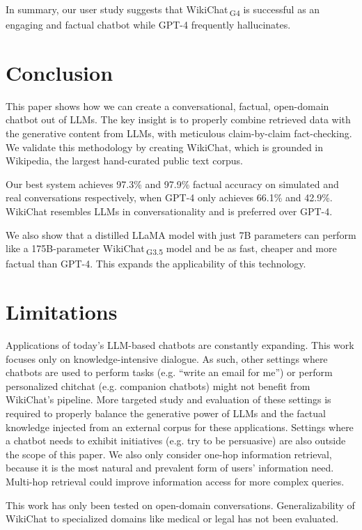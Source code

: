 \documentclass[11pt]{article}
\newcommand{\system}[0]{WikiChat\xspace}
\newcommand{\systemgt}[0]{WikiChat$\,$\textsubscript{G3.5}\xspace}
\newcommand{\systemgf}[0]{WikiChat$\,$\textsubscript{G4}\xspace}
\begin{document}
In summary, our user study suggests that \systemgf is successful as an engaging and factual chatbot while GPT-4 frequently hallucinates.


\section{Conclusion}
This paper shows how we can create a conversational, factual, open-domain chatbot out of LLMs. The key insight is to properly combine retrieved data with the generative content from LLMs, with meticulous claim-by-claim fact-checking. We validate this methodology by creating \system, which is grounded in Wikipedia, the largest hand-curated public text corpus. 

Our best system achieves 97.3\% and 97.9\% factual accuracy on simulated and real conversations respectively, when GPT-4 only achieves 66.1\% and 42.9\%. \system  resembles LLMs in conversationality and is preferred over GPT-4.


We also show that a distilled LLaMA model with just 7B parameters can perform like a 175B-parameter \systemgt model and be as fast, cheaper and more factual than GPT-4. This expands the applicability of this technology.


\section*{Limitations}
Applications of today's LLM-based chatbots are constantly expanding. This work focuses only on knowledge-intensive dialogue. As such, other settings where chatbots are used to perform tasks (e.g. ``write an email for me'') or perform personalized chitchat (e.g. companion chatbots) might not benefit from \system's pipeline. More targeted study and evaluation of these settings is required to properly balance the generative power of LLMs and the factual knowledge injected from an external corpus for these applications. Settings where a chatbot needs to exhibit initiatives (e.g. try to be persuasive) are also outside the scope of this paper.
We also only consider one-hop information retrieval, because it is the most natural and prevalent form of users' information need. Multi-hop retrieval could improve information access for more complex queries. 

This work has only been tested on open-domain conversations. Generalizability of \system to specialized domains like medical or legal has not been evaluated. 
\end{document}
